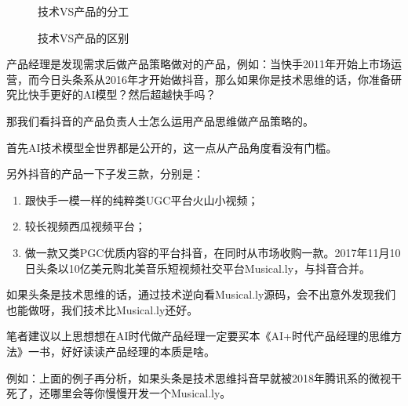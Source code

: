 \documentclass[letterpaper,10pt,english]{sphinxmanual}
\begin{document}
\begin{figure}[H]
\centering
\capstart

\noindent{}
\caption{技术VS产品的分工}\label{\detokenize{chapter_introduction/PM:id73}}\end{figure}

\begin{figure}[H]
\centering
\capstart

\noindent{}
\caption{技术VS产品的区别\sphinxfootnotemark[201]}\label{\detokenize{chapter_introduction/PM:id74}}\end{figure}
%
\begin{footnotetext}[201]\sphinxAtStartFootnote
{}
%
\end{footnotetext}\ignorespaces 
产品经理是发现需求后做产品策略做对的产品，例如：当快手2011年开始上市场运营，而今日头条系从2016年才开始做抖音，那么如果你是技术思维的话，你准备研究比快手更好的AI模型？然后超越快手吗？

那我们看抖音的产品负责人士怎么运用产品思维做产品策略的。

首先AI技术模型全世界都是公开的，这一点从产品角度看没有门槛。

另外抖音的产品一下子发三款，分别是：
\begin{enumerate}
%
\item {} 
跟快手一模一样的纯粹类UGC平台火山小视频；

\item {} 
较长视频西瓜视频平台；

\item {} 
做一款又类PGC优质内容的平台抖音，在同时从市场收购一款。2017年11月10日头条以10亿美元购北美音乐短视频社交平台Musical.ly，与抖音合并。

\end{enumerate}

如果头条是技术思维的话，通过技术逆向看Musical.ly源码，会不出意外发现我们也能做呀，我们技术比Musical.ly还好。

笔者建议以上思想想在AI时代做产品经理一定要买本《AI+时代产品经理的思维方法》一书，好好读读产品经理的本质是啥。

例如：上面的例子再分析，如果头条是技术思维抖音早就被2018年腾讯系的微视干死了，还哪里会等你慢慢开发一个Musical.ly。
\end{document}

